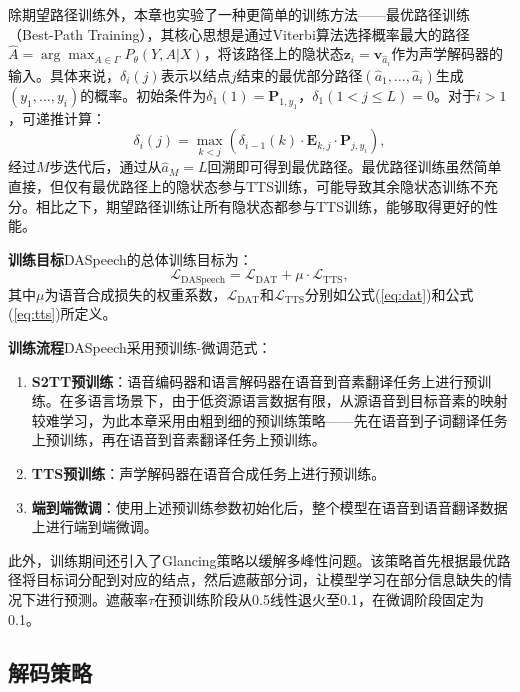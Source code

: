 除期望路径训练外，本章也实验了一种更简单的训练方法——最优路径训练（Best-Path Training），其核心思想是通过Viterbi算法\citep{viterbi}选择概率最大的路径$\hat{A}=\arg\max_{A\in\Gamma} P_\theta(Y,A|X)$，将该路径上的隐状态$\mathbf{z}_i=\mathbf{v}_{\hat{a}_i}$作为声学解码器的输入。具体来说，$\delta_i(j)$表示以结点$j$结束的最优部分路径$(\hat{a}_1, \ldots, \hat{a}_i)$生成$(y_1, \ldots, y_i)$的概率。初始条件为$\delta_1(1)=\mathbf{P}_{1, y_1}$，$\delta_1(1<j\leq L)=0$。对于$i>1$，可递推计算：
\begin{equation}
    \delta_i(j) = \max_{k<j} (\delta_{i-1}(k)\cdot \mathbf{E}_{k, j} \cdot \mathbf{P}_{j, y_i}),
\end{equation}
经过$M$步迭代后，通过从$\hat{a}_M=L$回溯即可得到最优路径。最优路径训练虽然简单直接，但仅有最优路径上的隐状态参与TTS训练，可能导致其余隐状态训练不充分。相比之下，期望路径训练让所有隐状态都参与TTS训练，能够取得更好的性能。

\textbf{训练目标}\quad DASpeech的总体训练目标为：
\begin{equation}
    \mathcal{L}_{\text{DASpeech}}=\mathcal{L}_{\text{DAT}} + \mu\cdot \mathcal{L}_{\text{TTS}},\label{eq:daspeech}
\end{equation}
其中$\mu$为语音合成损失的权重系数，$\mathcal{L}_{\text{DAT}}$和$\mathcal{L}_{\text{TTS}}$分别如公式(\ref{eq:dat})和公式(\ref{eq:tts})所定义。

\textbf{训练流程}\quad DASpeech采用预训练-微调范式：
\begin{enumerate}
    \item \textbf{S2TT预训练}：语音编码器和语言解码器在语音到音素翻译任务上进行预训练。在多语言场景下，由于低资源语言数据有限，从源语音到目标音素的映射较难学习，为此本章采用由粗到细的预训练策略——先在语音到子词翻译任务上预训练，再在语音到音素翻译任务上预训练。
    \item \textbf{TTS预训练}：声学解码器在语音合成任务上进行预训练。
    \item \textbf{端到端微调}：使用上述预训练参数初始化后，整个模型在语音到语音翻译数据上进行端到端微调。
\end{enumerate}

此外，训练期间还引入了Glancing策略\citep{qian-etal-2021-glancing}以缓解多峰性问题。该策略首先根据最优路径将目标词分配到对应的结点，然后遮蔽部分词，让模型学习在部分信息缺失的情况下进行预测。遮蔽率$\tau$在预训练阶段从0.5线性退火至0.1，在微调阶段固定为0.1。


\subsection{解码策略}\label{sec:daspeech_infer}

